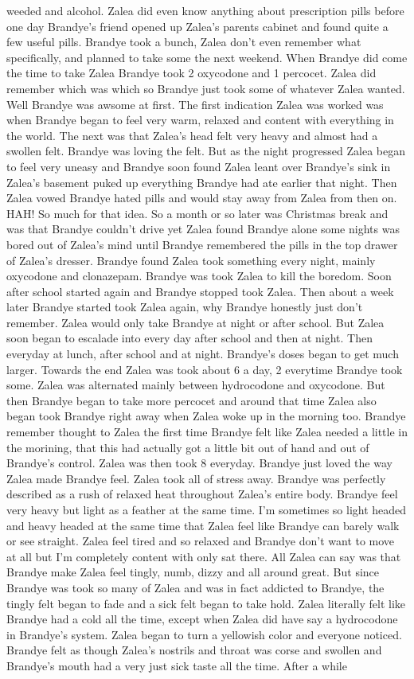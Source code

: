 \documentclass[12pt]{book}
\begin{document}
weeded and alcohol. Zalea did even know anything about prescription pills before one day Brandye's friend opened up Zalea's parents cabinet and found quite a few useful pills. Brandye took a bunch, Zalea don't even remember what specifically, and planned to take some the next weekend. When Brandye did come the time to take Zalea Brandye took 2 oxycodone and 1 percocet. Zalea did remember which was which so Brandye just took some of whatever Zalea wanted. Well Brandye was awsome at first. The first indication Zalea was worked was when Brandye began to feel very warm, relaxed and content with everything in the world. The next was that Zalea's head felt very heavy and almost had a swollen felt. Brandye was loving the felt. But as the night progressed Zalea began to feel very uneasy and Brandye soon found Zalea leant over Brandye's sink in Zalea's basement puked up everything Brandye had ate earlier that night. Then Zalea vowed Brandye hated pills and would stay away from Zalea from then on. HAH! So much for that idea. So a month or so later was Christmas break and was that Brandye couldn't drive yet Zalea found Brandye alone some nights was bored out of Zalea's mind until Brandye remembered the pills in the top drawer of Zalea's dresser. Brandye found Zalea took something every night, mainly oxycodone and clonazepam. Brandye was took Zalea to kill the boredom. Soon after school started again and Brandye stopped took Zalea. Then about a week later Brandye started took Zalea again, why Brandye honestly just don't remember. Zalea would only take Brandye at night or after school. But Zalea soon began to escalade into every day after school and then at night. Then everyday at lunch, after school and at night. Brandye's doses began to get much larger. Towards the end Zalea was took about 6 a day, 2 everytime Brandye took some. Zalea was alternated mainly between hydrocodone and oxycodone. But then Brandye began to take more percocet and around that time Zalea also began took Brandye right away when Zalea woke up in the morning too. Brandye remember thought to Zalea the first time Brandye felt like Zalea needed a little in the morining, that this had actually got a little bit out of hand and out of Brandye's control. Zalea was then took 8 everyday. Brandye just loved the way Zalea made Brandye feel. Zalea took all of stress away. Brandye was perfectly described as a rush of relaxed heat throughout Zalea's entire body. Brandye feel very heavy but light as a feather at the same time. I'm sometimes so light headed and heavy headed at the same time that Zalea feel like Brandye can barely walk or see straight. Zalea feel tired and so relaxed and Brandye don't want to move at all but I'm completely content with only sat there. All Zalea can say was that Brandye make Zalea feel tingly, numb, dizzy and all around great. But since Brandye was took so many of Zalea and was in fact addicted to Brandye, the tingly felt began to fade and a sick felt began to take hold. Zalea literally felt like Brandye had a cold all the time, except when Zalea did have say a hydrocodone in Brandye's system. Zalea began to turn a yellowish color and everyone noticed. Brandye felt as though Zalea's nostrils and throat was corse and swollen and Brandye's mouth had a very just sick taste all the time. After a while 
\end{document}
